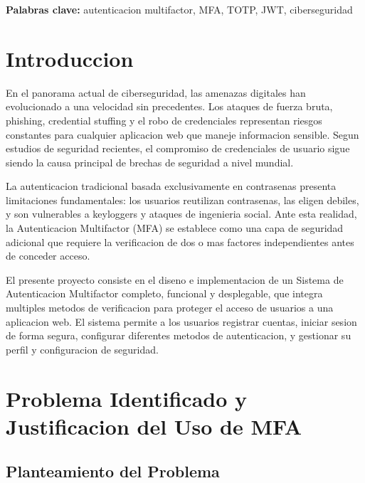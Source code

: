 \documentclass[12pt,a4paper]{article}
\begin{document}
\vspace{1cm}
\begin{center}
{\small\textbf{Palabras clave:} autenticacion multifactor, MFA, TOTP, JWT, ciberseguridad}
\end{center}

\newpage
\setcounter{page}{1}

\section{Introduccion}

En el panorama actual de ciberseguridad, las amenazas digitales han evolucionado a una velocidad sin precedentes. Los ataques de fuerza bruta, phishing, credential stuffing y el robo de credenciales representan riesgos constantes para cualquier aplicacion web que maneje informacion sensible. Segun estudios de seguridad recientes, el compromiso de credenciales de usuario sigue siendo la causa principal de brechas de seguridad a nivel mundial.

La autenticacion tradicional basada exclusivamente en contrasenas presenta limitaciones fundamentales: los usuarios reutilizan contrasenas, las eligen debiles, y son vulnerables a keyloggers y ataques de ingenieria social. Ante esta realidad, la Autenticacion Multifactor (MFA) se establece como una capa de seguridad adicional que requiere la verificacion de dos o mas factores independientes antes de conceder acceso.

El presente proyecto consiste en el diseno e implementacion de un Sistema de Autenticacion Multifactor completo, funcional y desplegable, que integra multiples metodos de verificacion para proteger el acceso de usuarios a una aplicacion web. El sistema permite a los usuarios registrar cuentas, iniciar sesion de forma segura, configurar diferentes metodos de autenticacion, y gestionar su perfil y configuracion de seguridad.

\section{Problema Identificado y Justificacion del Uso de MFA}

\subsection{Planteamiento del Problema}
\end{document}

